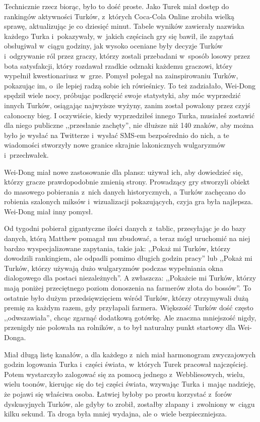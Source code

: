 \documentclass[oneside,polish,11pt,rmheadings]{mwbk}
\begin{document}
Technicznie rzecz biorąc, było to dość proste. Jako Turek miał dostęp do rankingów aktywności Turków, z~których Coca-Cola Online zrobiła wielką sprawę, aktualizując je co dziesięć minut. Tabele wyników zawierały nazwiska każdego Turka i~pokazywały, w~jakich częściach gry się bawił, ile zapytań obsługiwał w~ciągu godziny, jak wysoko oceniane były decyzje Turków i~odgrywanie ról przez graczy, którzy zostali przebadani w~sposób losowy przez bota satysfakcji, który rozdawał rzadkie odznaki każdemu graczowi, który wypełnił kwestionariusz w~grze. Pomysł polegał na zainspirowaniu Turków, pokazując im, o~ile lepiej radzą sobie ich rówieśnicy. To też zadziałało, Wei-Dong spędził wiele nocy, próbując podkręcić swoje statystyki, aby móc wyprzedzić innych Turków, osiągając najwyższe wyżyny, zanim został powalony przez czyjś całonocny bieg. I oczywiście, kiedy wyprzedziłeś innego Turka, musiałeś zostawić dla niego publiczne ,,przesłanie zachęty'', nie dłuższe niż 140 znaków, aby można było je wysłać na Twitterze i~wysłać SMS-em bezpośrednio do nich, a te wiadomości stworzyły nowe granice skrajnie lakonicznych wulgaryzmów i~przechwałek. 

Wei-Dong miał nowe zastosowanie dla plansz: używał ich, aby dowiedzieć się, którzy gracze prawdopodobnie zmienią strony. Prowadzący gry stworzyli obiekt do masowego pobierania z~nich danych historycznych, a Turków zachęcano do robienia szalonych miksów i~wizualizacji pokazujących, czyja gra była najlepsza. Wei-Dong miał inny pomysł.

Od tygodni pobierał gigantyczne ilości danych z~tablic, przesyłając je do bazy danych, którą Matthew pomagał mu zbudować, a teraz mógł uruchomić na niej bardzo wyspecjalizowane zapytania, takie jak: ,,Pokaż mi Turków, którzy dowodzili rankingiem, ale odpadli pomimo długich godzin pracy'' lub ,,Pokaż mi Turków, którzy używają dużo wulgaryzmów podczas wypełniania okna dialogowego dla postaci niezależnych''. A zwłaszcza: ,,Pokażcie mi Turków, którzy mają poniżej przeciętnego poziom donoszenia na farmerów złota do bossów''. To ostatnie było dużym przedsięwzięciem wśród Turków, którzy otrzymywali dużą premię za każdym razem, gdy przyłapali farmera. Większość Turków dość często ,,odwszawiała'', chcąc zgarnąć dodatkową gotówkę. Ale znaczna mniejszość nigdy, przenigdy nie polowała na rolników, a to był naturalny punkt startowy dla Wei-Donga. 

Miał długą listę kanałów, a dla każdego z~nich miał harmonogram zwyczajowych godzin logowania Turka i~części świata, w~których Turek pracował najczęściej. Potem wystarczyło zalogować się za pomocą jednego z~Webbliesowych, wielu, wielu toonów, kierując się do tej części świata, wzywając Turka i~mając nadzieję, że pojawi się właściwa osoba. Łatwiej byłoby po prostu korzystać z~forów dyskusyjnych Turków, ale gdyby to zrobił, zostałby złapany i~zwolniony w~ciągu kilku sekund. Ta droga była mniej wydajna, ale o~wiele bezpieczniejsza.
\end{document}
